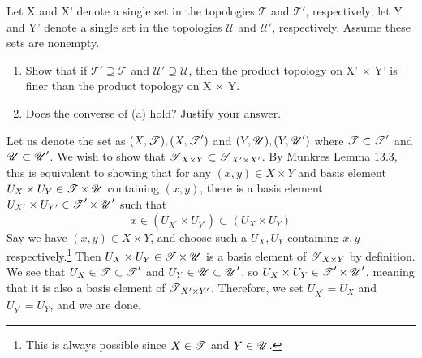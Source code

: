   \begin{exercise}[Munkres 16.5]
    Let X and X' denote a single set in the topologies $\mathcal{T}$ and $\mathcal{T}'$, respectively; let Y and Y' denote a single set in the topologies $\mathcal{U}$ and $\mathcal{U}'$, respectively. Assume these sets are nonempty.
    \begin{enumerate}
      \item Show that if $\mathcal{T}' \supseteq \mathcal{T}$ and $\mathcal{U}' \supseteq \mathcal{U}$, then the product topology on X' × Y' is finer than the product topology on X × Y.
      \item Does the converse of (a) hold? Justify your answer.
    \end{enumerate}
  \end{exercise}
  \begin{solution}[Munkres 16.5.a] 
    Let us denote the set as $(X,\operatorname{\mathscr{T}}), (X, \operatorname{\mathscr{T}}^\prime)$ and $(Y, \operatorname{\mathscr{U}}), (Y, \operatorname{\mathscr{U}}^\prime)$ where $\operatorname{\mathscr{T}} \subset \operatorname{\mathscr{T}}^\prime$ and $\operatorname{\mathscr{U}} \subset \operatorname{\mathscr{U}}^\prime$. We wish to show that $\operatorname{\mathscr{T}}_{X \times Y} \subset \operatorname{\mathscr{T}}_{X^\prime \times X^\prime}$. By Munkres Lemma 13.3, this is equivalent to showing that for any $(x, y) \in X \times Y$ and basis element $U_X \times U_Y \in \operatorname{\mathscr{T}} \times \operatorname{\mathscr{U}}$ containing $(x, y)$, there is a basis element $U_{X^\prime} \times U_{Y^\prime} \in \operatorname{\mathscr{T}}^\prime \times \operatorname{\mathscr{U}}^\prime$ such that 
    \begin{equation}
      x \in (U_{X^\prime} \times U_{Y^\prime}) \subset (U_X \times U_Y)
    \end{equation}
    Say we have $(x, y) \in X \times Y$, and choose such a $U_X, U_Y$ containing $x, y$ respectively.\footnote{This is always possible since $X \in \operatorname{\mathscr{T}}$ and $Y \in \operatorname{\mathscr{U}}$. } Then $U_X \times U_Y \in \operatorname{\mathscr{T}} \times \operatorname{\mathscr{U}}$ is a basis element of $\operatorname{\mathscr{T}}_{X \times Y}$ by definition. We see that $U_X \in \operatorname{\mathscr{T}} \subset \operatorname{\mathscr{T}}^\prime$ and $U_Y \in \operatorname{\mathscr{U}} \subset \operatorname{\mathscr{U}}^\prime$, so $U_X \times U_Y \in \operatorname{\mathscr{T}}^\prime \times \operatorname{\mathscr{U}}^\prime$, meaning that it is also a basis element of $\operatorname{\mathscr{T}}_{X^\prime \times Y^\prime}$. Therefore, we set $U_{X^\prime} = U_X$ and $U_{Y^\prime} = U_Y$, and we are done. 
  \end{solution}
